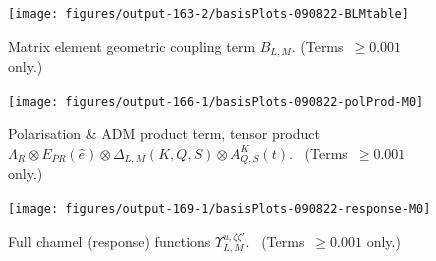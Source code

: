 \documentclass[10pt]{article}
\begin{document}
\begin{figure}[H]
\begin{center}
\texttt{[image: figures/output-163-2/basisPlots-090822-BLMtable]}
\caption{{Matrix element geometric coupling term \(B_{L,M}\).
(Terms~\(\ge0.001\) only.)
{\label{776753}}%
}}
\end{center}
\end{figure}
\begin{figure}[H]
\begin{center}
\texttt{[image: figures/output-166-1/basisPlots-090822-polProd-M0]}
\caption{{Polarisation \& ADM product term, tensor product \(\Lambda_{R}\otimes E_{PR}(\hat{e})\otimes\Delta_{L,M}(K,Q,S)\otimes
A^{K}_{Q,S}(t)\).~
(Terms~\(\ge0.001\) only.) ~
{\label{652406}}%
}}
\end{center}
\end{figure}
\begin{figure}[H]
\begin{center}
\texttt{[image: figures/output-169-1/basisPlots-090822-response-M0]}
\caption{{Full channel (response) functions \(\varUpsilon_{L,M}^{u,\zeta\zeta'}\).~
(Terms~\(\ge0.001\) only.) ~
{\label{676540}}%
}}
\end{center}
\end{figure}









\end{document}
